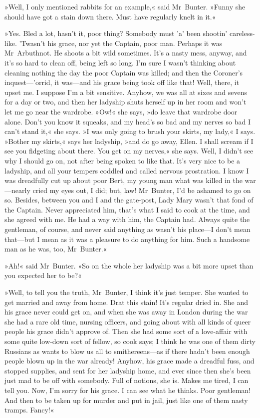 »Well, I only mentioned rabbits for an example,« said Mr~Bunter.  »Funny she should have got a stain down there. Must have regularly knelt in it.«

»Yes. Bled a lot, hasn't it, poor thing? Somebody must 'a' been shootin' careless-like. 'Twasn't his grace, nor yet the Captain, poor man. Perhaps it was Mr~Arbuthnot. He shoots a bit wild sometimes.  It's a nasty mess, anyway, and it's so hard to clean off, being left so long. I'm sure I wasn't thinking about cleaning nothing the day the poor Captain was killed; and then the Coroner's inquest—'orrid, it was—and his grace being took off like that! Well, there, it upset me.  I suppose I'm a bit sensitive. Anyhow, we was all at sixes and sevens for a day or two, and then her ladyship shuts herself up in her room and won't let me go near the wardrobe. »Ow!« she says, »do leave that wardrobe door alone. Don't you know it squeaks, and my head's so bad and my nerves so bad I can't stand it,« she says. »I was only going to brush your skirts, my lady,« I says. »Bother my skirts,« says her ladyship, »and do go away, Ellen. I shall scream if I see you fidgeting about there. You get on my nerves,« she says. Well, I didn't see why I should go on, not after being spoken to like that. It's very nice to be a ladyship, and all your tempers coddled and called nervous prostration. I know I was dreadfully cut up about poor Bert, my young man what was killed in the war—nearly cried my eyes out, I did; but, law! Mr~Bunter, I'd be ashamed to go on so. Besides, between you and I and the gate-post, Lady Mary wasn't that fond of the Captain. Never appreciated him, that's what I said to cook at the time, and she agreed with me. He had a way with him, the Captain had. Always quite the gentleman, of course, and never said anything as wasn't his place—I don't mean that—but I mean as it was a pleasure to do anything for him. Such a handsome man as he was, too, Mr~Bunter.«

»Ah!« said Mr~Bunter. »So on the whole her ladyship was a bit more upset than you expected her to be?«

»Well, to tell you the truth, Mr~Bunter, I think it's just temper. She wanted to get married and away from home. Drat this stain! It's regular dried in. She and his grace never could get on, and when she was away in London during the war she had a rare old time, nursing officers, and going about with all kinds of queer people his grace didn't approve of.  Then she had some sort of a love-affair with some quite low-down sort of fellow, so cook says; I think he was one of them dirty Russians as wants to blow us all to smithereens—as if there hadn't been enough people blown up in the war already! Anyhow, his grace made a dreadful fuss, and stopped supplies, and sent for her ladyship home, and ever since then she's been just mad to be off with somebody. Full of notions, she is. Makes me tired, I can tell you. Now, I'm sorry for his grace. I can see what he thinks. Poor gentleman! And then to be taken up for murder and put in jail, just like one of them nasty tramps.  Fancy!«

